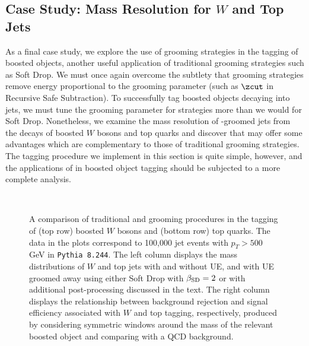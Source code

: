 \subsection{Case Study: Mass Resolution for \(W\) and Top Jets}
\label{sec:massres}

    As a final case study, we explore the use of \PIRANHA{} grooming strategies in the tagging of boosted objects, another useful application of traditional grooming strategies such as Soft Drop.
   We must once again overcome the subtlety that \PIRANHA{} grooming strategies remove energy proportional to the grooming parameter (such as \(\zcut\) in Recursive Safe Subtraction).
   To successfully tag boosted objects decaying into jets, we must tune the grooming parameter for \PIRANHA{} strategies more than we would for Soft Drop.
   Nonetheless, we examine the mass resolution of \PIRANHA{}-groomed jets from the decays of boosted \(W\) bosons and top quarks and discover that \PIRANHA{} may offer some advantages which are complementary to those of traditional grooming strategies.
   The tagging procedure we implement in this section is quite simple, however, and the applications of \PIRANHA{} in boosted object tagging should be subjected to a more complete analysis.

\begin{figure}[p]
\centering
{}
\\
\caption{
     A comparison of traditional and \PIRANHA{} grooming procedures in the tagging of (top row) boosted \(W\) bosons and (bottom row) top quarks.
      The data in the plots correspond to 100,000 jet events with \(p_T > 500\) GeV in \texttt{Pythia 8.244}.
      The left column displays the mass distributions of \(W\) and top jets with and without UE, and with UE groomed away using either Soft Drop with \(\beta_{\rm SD} = 2\) or  with additional post-processing discussed in the text.
      The right column displays the relationship between background rejection and signal efficiency associated with \(W\) and top tagging, respectively, produced by considering symmetric windows around the mass of the relevant boosted object and comparing with a QCD background.
      }
\label{fig:tagging}
\end{figure}

